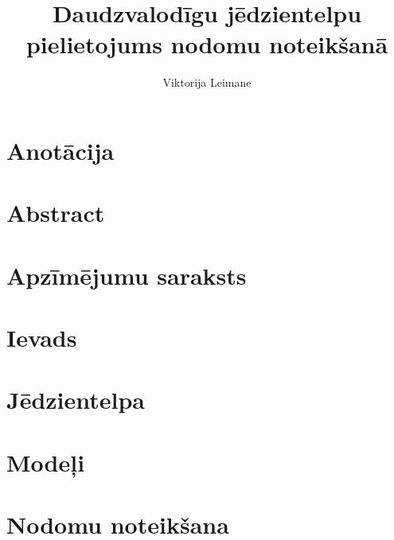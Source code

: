 \documentclass[12pt,oneside]{LuThesis}
\title{Daudzvalodīgu jēdzientelpu pielietojums nodomu noteikšanā}
\author{Viktorija Leimane}
\begin{document}
\maketitle

\chapter*{Anotācija}
\setcounter{page}{1}
\begin{abstract}

\end{abstract}

\chapter*{Abstract}
\begin{english}
\begin{abstract}

\end{abstract}
\end{english}

\tableofcontents


\chapter*{Apzīmējumu saraksts}



\chapter*{Ievads}



\chapter{Jēdzientelpa}


\chapter{Modeļi}


\chapter{Nodomu noteikšana}


% 
\end{document}
